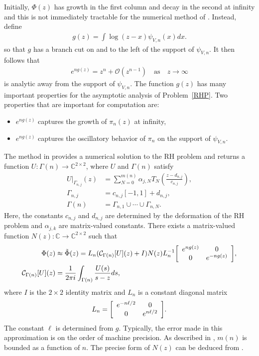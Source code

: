 \documentclass[final]{siamltex}
\newenvironment{mat}{\left[\begin{array}{ccccccccccccccc}}{\end{array}\right]}
\begin{document}
Initially, $\Phi(z)$ has growth in the first column and decay in the second at infinity and this is not immediately tractable for the numerical method of \cite{SORHFramework}.  Instead, define
\begin{align*}
g(z) = \int \log(z-x) \psi_{V,n}(x) dx.
\end{align*}
so that  $g$ has a branch cut on and to the left of the support of $\psi_{V,n}$.  It then follows that
\begin{align*}
e^{n g(z)} = z^n + {\mathcal O}(z^{n-1}) \quad \text{as} \quad z \rightarrow \infty
\end{align*}
is analytic away from the support of $\psi_{V,n}$.  The function $g(z)$ has many important properties for the asymptotic analysis of Problem~\ref{RHP}.  Two properties that are important for computation are: 
\begin{itemize}
\item $e^{n g(z)}$ captures the growth of $\pi_n(z)$ at infinity,
\item $e^{n g(z)}$ captures the oscillatory behavior of $\pi_n$ on the support of $\psi_{V,n}$.
\end{itemize}

The method in \cite{TrogdonSORMT} provides a numerical solution to the RH problem and 
returns a function $U: \Gamma(n) \rightarrow \mathbb C^{2\times 2}$, where $U$ and $\Gamma(n)$ satisfy
\begin{align*}
U|_{\Gamma_{n,j}}(z) &= \sum_{N=0}^{m(n)} \alpha_{j,N} T_N \left( \frac{z-d_{n,j}}{c_{n,j}}  \right),\\
\Gamma_{n,j} &= c_{n,j} [-1,1] + d_{n,j},\\
\Gamma(n) &= \Gamma_{n,1} \cup \cdots \cup \Gamma_{n,N}.
\end{align*}
Here, the constants $c_{n,j}$ and $d_{n,j}$ are determined by the deformation of the RH problem and $\alpha_{j,k}$ are matrix-valued constants.  There exists a matrix-valued function $N(z):\mathbb{C}\rightarrow\mathbb{C}^{2\times 2}$ 
such that~\cite{TrogdonSORMT}
\begin{align}\label{e:Soln}
\Phi(z) &\approx \tilde \Phi(z) = L_n ({\mathcal C}_{\Gamma(n)}[U](z)+ I)N(z) L_n^{-1} \begin{mat} e^{n g(z)} & 0 \\ 0 & e^{-ng(z)} \end{mat},\\
{\mathcal C}_{\Gamma(n)}[U](z) &= \frac{1}{2\pi i} \int_{\Gamma(n)} \frac{U(s)}{s-z} ds,\notag
\end{align}
where $I$ is the $2\times 2$ identity matrix and $L_n$ is a constant diagonal matrix
\begin{align*}
L_n = \begin{mat} e^{-n\ell/2}  & 0 \\ 0 & e^{n\ell/2} \end{mat}.
\end{align*}
The constant $\ell$ is determined from $g$.  Typically, the error made in this approximation is on the order of machine precision.   As described in \cite{TrogdonSORMT}, $m(n)$ is bounded as a function of $n$.  The precise form of $N(z)$ can be deduced from \cite[Section 4]{TrogdonSORMT}.
\end{document}
